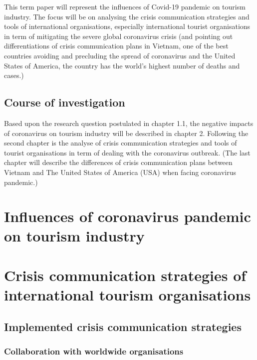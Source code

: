 \documentclass[draft=false
              ,paper=a4
              ,twoside=false
              ,fontsize=12pt
              ,headsepline
              ,BCOR10mm
              ,DIV11
              ]{scrbook}
\begin{document}
This term paper will represent the influences of Covid-19 pandemic on tourism industry. The focus will be on analysing the crisis communication strategies and tools of international organisations, especially international tourist organisations in term of mitigating the severe global coronavirus crisis (and pointing out differentiations of crisis communication plans in Vietnam, one of the best countries avoiding and precluding the spread of coronavirus and the United States of America, the country has the world’s highest number of deaths and cases.)

\vspace{12pt}
\section{Course of investigation}
\vspace{6pt}
Based upon the research question postulated in chapter 1.1, the negative impacts of coronavirus on tourism industry will be described in chapter 2. Following the second chapter is the analyse of crisis communication strategies and tools of tourist organisations in term of dealing with the coronavirus outbreak. (The last chapter will describe the differences of crisis communication plans between Vietnam and The United States of America (USA) when facing coronavirus pandemic.)

\vspace{12pt}
\chapter{\phantom{o}Influences of coronavirus pandemic on tourism industry}
\vspace{6pt}

\vspace{12pt}
\chapter{\phantom{o}Crisis communication strategies of international tourism organisations}
\vspace{6pt}
\section{Implemented crisis communication strategies}
\vspace{6pt}
\subsection{Collaboration with worldwide organisations}
\vspace{6pt}
\end{document}
